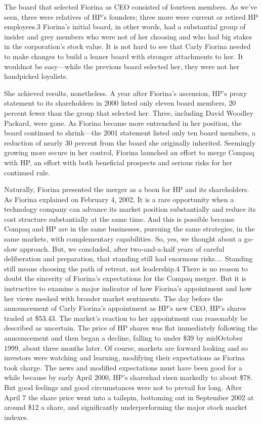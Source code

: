 \documentclass[10pt]{article}
\begin{document}
{\large The board that selected Fiorina as CEO consisted of fourteen members. As
we've seen, three were relatives of HP's founders; three more were current or
retired HP employees.3 Fiorina's initial board, in other words, had a substantial
group of insider and grey members who were not of her choosing and who had big
stakes in the corporation's stock value. It is not hard to see that Carly Fiorina
needed to make changes to build a leaner board with stronger attachments to her.
It wouldnot be easy---while the previous board selected her, they were not her
handpicked loyalists.}

{\large She achieved results, nonetheless. A year after Fiorina's ascension,
HP's proxy statement to its shareholders in 2000 listed only eleven board
members, 20 percent fewer than the group that selected her. Three, including
David Woodley Packard, were gone. As Fiorina became more entrenched in her
position, the board continued to shrink---the 2001 statement listed only ten
board members, a reduction of nearly 30 percent from the board she originally
inherited. Seemingly growing more secure in her control, Fiorina launched an
effort to merge Compaq with HP, an effort with both beneficial prospects and
serious risks for her continued rule.}

{\large Naturally, Fiorina presented the merger as a boon for HP and its
shareholders. As Fiorina explained on February 4, 2002, It is a rare opportunity
when a technology company can advance its market position substantially and
reduce its cost structure substantially at the same time. And this is possible
because Compaq and HP are in the same businesses, pursuing the same strategies,
in the same markets, with complementary capabilities. So, yes, we thought about a
go-slow approach. But, we concluded, after two-and-a-half years of careful
deliberation and preparation, that standing still had enormous risks.... Standing
still means choosing the path of retreat, not leadership.4 There is no reason to
doubt the sincerity of Fiorina's expectations for the Compaq merger. But it is
instructive to examine a major indicator of how Fiorina's appointment and how her
views meshed with broader market sentiments. The day before the announcement of
Carly Fiorina's appointment as HP's new CEO, HP's shares traded at \$53.43. The
market's reaction to her appointment can reasonably be described as uncertain.
The price of HP shares was flat immediately following the announcement and then
began a decline, falling to under \$39 by midOctober 1999, about three months
later. Of course, markets are forward looking and so investors were watching and
learning, modifying their expectations as Fiorina took charge. The news and
modified expectations must have been good for a while because by early April
2000, HP's shareshad risen markedly to about \$78. But good feelings and good
circumstances were not to prevail for long. After April 7 the share price went
into a tailspin, bottoming out in September 2002 at around \$12 a share, and
significantly underperforming the major stock market indexes.}
\end{document}
